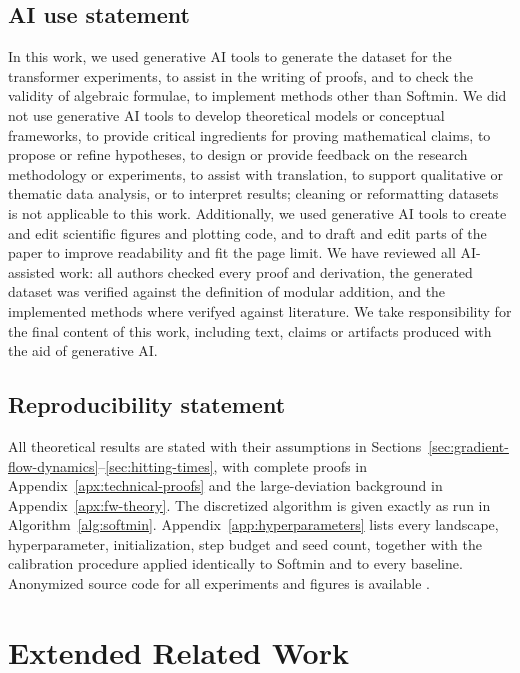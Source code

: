 \documentclass{article} %
\theoremstyle{plain}
\theoremstyle{definition}
\theoremstyle{remark}
\begin{document}
\subsection*{AI use statement}
In this work, we used generative AI tools to generate the dataset for the transformer experiments, to assist in the writing of proofs, and to check the validity of algebraic formulae, to implement methods other than Softmin. We did not use generative AI tools to develop theoretical models or conceptual frameworks, to provide critical ingredients for proving mathematical claims, to propose or refine hypotheses, to design or provide feedback on the research methodology or experiments, to assist with translation, to support qualitative or thematic data analysis, or to interpret results; cleaning or reformatting datasets is not applicable to this work. Additionally, we used generative AI tools to create and edit scientific figures and plotting code, and to draft and edit parts of the paper to improve readability and fit the page limit. We have reviewed all AI-assisted work: all authors checked every proof and derivation, the generated dataset was verified against the definition of modular addition, and the implemented methods where verifyed against literature. We take responsibility for the final content of this work, including text, claims or artifacts produced with the aid of generative AI.


\subsection*{Reproducibility statement}
All theoretical results are stated with their assumptions in Sections~\ref{sec:gradient-flow-dynamics}--\ref{sec:hitting-times}, with complete proofs in Appendix~\ref{apx:technical-proofs} and the large-deviation background in Appendix~\ref{apx:fw-theory}. The discretized algorithm is given exactly as run in Algorithm~\ref{alg:softmin}. Appendix~\ref{app:hyperparameters} lists every landscape, hyperparameter, initialization, step budget and seed count, together with the calibration procedure applied identically to Softmin and to every baseline. Anonymized source code for all experiments and figures is available \citep{softmin_energy_2026}.




\newpage
\appendix
\section{Extended Related Work}
\label{apx:related}
\end{document}
